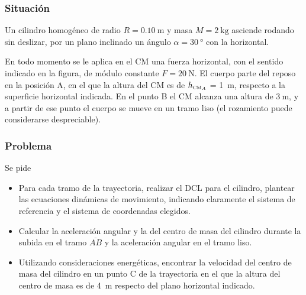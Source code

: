 \documentclass[a4paper]{beamer}
\newcommand{\tcm}{\ensuremath\text{\tiny CM}}
\begin{document}
\frame{\titlepage}
\begin{frame}

	\frametitle{Situación}
	Un cilindro homogéneo de radio $R = \qty{0.10}{\meter}$ y masa $M = \qty{2}{\kilo\gram}$ asciende rodando sin deslizar, por un plano inclinado un ángulo $\alpha = \qty{30}{\degree}$ con la horizontal.
	\vspace{-2em}
	\begin{figure}
		\label{fig:}
	\end{figure}
	\begin{justify}
		En todo momento se le aplica en el CM una fuerza horizontal, con el sentido indicado en la figura, de módulo constante $F = \qty{20}{\newton}$.
		El cuerpo parte del reposo en la posición A, en el que la altura del CM es de $h_{\tcm_A}$ = \qty{1}{\meter}, respecto a la superficie horizontal indicada.
		En el punto B el CM alcanza una altura de $\qty{3}{\meter}$, y a partir de ese punto el cuerpo se mueve en un tramo liso (el rozamiento puede considerarse despreciable).
	\end{justify}

\end{frame}

\begin{frame}
	\frametitle{Problema}
	Se pide
	\begin{itemize}
		\item Para cada tramo de la trayectoria, realizar el DCL para el cilindro, plantear las ecuaciones dinámicas de movimiento, indicando claramente el sistema de referencia y el sistema de coordenadas elegidos.
		\item Calcular la aceleración angular y la del centro de masa del cilindro durante la subida en el tramo $\overline{AB}$ y la aceleración angular en el tramo liso.
		\item Utilizando consideraciones energéticas, encontrar la velocidad del centro de masa del cilindro en un punto C de la trayectoria en el que la altura del centro de masa es de \qty{4}{\meter} respecto del plano horizontal indicado.
	\end{itemize}


\end{frame}
\end{document}

